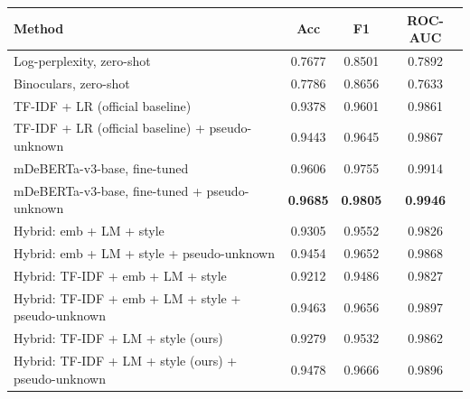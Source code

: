 \begin{tabular}{|l|ccc|}
\hline
Method & Acc & F1 & ROC-AUC \\
\hline
Log-perplexity, zero-shot & 0.7677 & 0.8501 & 0.7892 \\
Binoculars, zero-shot & 0.7786 & 0.8656 & 0.7633 \\
TF-IDF + LR (official baseline) & 0.9378 & 0.9601 & 0.9861 \\
TF-IDF + LR (official baseline) + pseudo-unknown & 0.9443 & 0.9645 & 0.9867 \\
mDeBERTa-v3-base, fine-tuned & 0.9606 & 0.9755 & 0.9914 \\
mDeBERTa-v3-base, fine-tuned + pseudo-unknown & \textbf{0.9685} & \textbf{0.9805} & \textbf{0.9946} \\
Hybrid: emb + LM + style & 0.9305 & 0.9552 & 0.9826 \\
Hybrid: emb + LM + style + pseudo-unknown & 0.9454 & 0.9652 & 0.9868 \\
Hybrid: TF-IDF + emb + LM + style & 0.9212 & 0.9486 & 0.9827 \\
Hybrid: TF-IDF + emb + LM + style + pseudo-unknown & 0.9463 & 0.9656 & 0.9897 \\
Hybrid: TF-IDF + LM + style (ours) & 0.9279 & 0.9532 & 0.9862 \\
Hybrid: TF-IDF + LM + style (ours) + pseudo-unknown & 0.9478 & 0.9666 & 0.9896 \\
\hline
\end{tabular}
